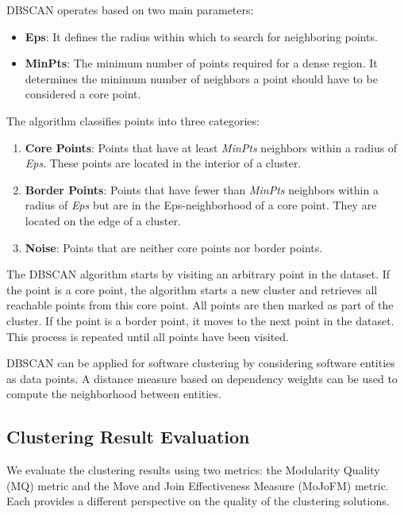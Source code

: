 \documentclass[12pt, a4paper, twoside]{report}
\begin{document}
DBSCAN operates based on two main parameters:

\begin{itemize}
\item \textbf{Eps}: It defines the radius within which to search for neighboring points.
\item \textbf{MinPts}: The minimum number of points required for a dense region. It determines the minimum number of neighbors a point should have to be considered a core point.
\end{itemize}

The algorithm classifies points into three categories:

\begin{enumerate}
\item \textbf{Core Points}: Points that have at least \textit{MinPts} neighbors within a radius of \textit{Eps}. These points are located in the interior of a cluster.
\item \textbf{Border Points}: Points that have fewer than \textit{MinPts} neighbors within a radius of \textit{Eps} but are in the Eps-neighborhood of a core point. They are located on the edge of a cluster.
\item \textbf{Noise}: Points that are neither core points nor border points.
\end{enumerate}

The DBSCAN algorithm starts by visiting an arbitrary point in the dataset. If the point is a core point, the algorithm starts a new cluster and retrieves all reachable points from this core point. All points are then marked as part of the cluster. If the point is a border point, it moves to the next point in the dataset. This process is repeated until all points have been visited.

DBSCAN can be applied for software clustering by considering software entities as data points. A distance measure based on dependency weights can be used to compute the neighborhood between entities.

\subsection{Clustering Result Evaluation}
\label{subsec:evaluation_def}

We evaluate the clustering results using two metrics: the Modularity Quality (MQ) metric and the Move and Join Effectiveness Measure (MoJoFM) metric. Each provides a different perspective on the quality of the clustering solutions.
\end{document}
